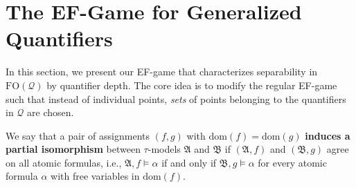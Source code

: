 \documentclass{article}
\newtheorem{theorem}{Theorem}[section]
\theoremstyle{definition}
\begin{document}


\section{The EF-Game for Generalized Quantifiers}\label{sec:ef-game}

In this section, we present our EF-game that characterizes separability in $\mathrm{FO}(\mathcal{Q})$ by quantifier depth. The core idea is to modify the regular EF-game such that instead of individual points, \textit{sets} of points belonging to the quantifiers in $\mathcal{Q}$ are chosen.

We say that a pair of assignments $(f,g)$ with $\mathrm{dom}(f)=\mathrm{dom}(g)$ \textbf{induces a partial isomorphism} between $\tau$-models $\mathfrak{A}$ and $\mathfrak{B}$ if $(\mathfrak{A},f)$ and $(\mathfrak{B},g)$ agree on all atomic formulas, i.e., $\mathfrak{A},f\models\alpha$ if and only if $\mathfrak{B},g\models\alpha$ for every atomic formula $\alpha$ with free variables in $\mathrm{dom}(f)$.
\end{document}
